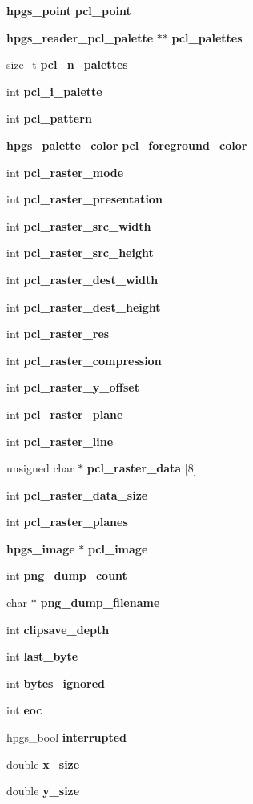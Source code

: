 \begin{DoxyCompactItemize}
{\bf hpgs\_\-point} {\bf pcl\_\-point}
\item 
{\bf hpgs\_\-reader\_\-pcl\_\-palette} $\ast$$\ast$ {\bf pcl\_\-palettes}
\item 
size\_\-t {\bf pcl\_\-n\_\-palettes}
\item 
int {\bf pcl\_\-i\_\-palette}
\item 
int {\bf pcl\_\-pattern}
\item 
{\bf hpgs\_\-palette\_\-color} {\bf pcl\_\-foreground\_\-color}
\item 
int {\bf pcl\_\-raster\_\-mode}
\item 
int {\bf pcl\_\-raster\_\-presentation}
\item 
int {\bf pcl\_\-raster\_\-src\_\-width}
\item 
int {\bf pcl\_\-raster\_\-src\_\-height}
\item 
int {\bf pcl\_\-raster\_\-dest\_\-width}
\item 
int {\bf pcl\_\-raster\_\-dest\_\-height}
\item 
int {\bf pcl\_\-raster\_\-res}
\item 
int {\bf pcl\_\-raster\_\-compression}
\item 
int {\bf pcl\_\-raster\_\-y\_\-offset}
\item 
int {\bf pcl\_\-raster\_\-plane}
\item 
int {\bf pcl\_\-raster\_\-line}
\item 
unsigned char $\ast$ {\bf pcl\_\-raster\_\-data} [8]
\item 
int {\bf pcl\_\-raster\_\-data\_\-size}
\item 
int {\bf pcl\_\-raster\_\-planes}
\item 
{\bf hpgs\_\-image} $\ast$ {\bf pcl\_\-image}
\item 
int {\bf png\_\-dump\_\-count}
\item 
char $\ast$ {\bf png\_\-dump\_\-filename}
\item 
int {\bf clipsave\_\-depth}
\item 
int {\bf last\_\-byte}
\item 
int {\bf bytes\_\-ignored}
\item 
int {\bf eoc}
\item 
hpgs\_\-bool {\bf interrupted}
\end{DoxyCompactItemize}
\begin{Indent}{\bf }\par
{\em \label{_amgrpd41d8cd98f00b204e9800998ecf8427e}
 }\begin{DoxyCompactItemize}
\item 
double {\bf x\_\-size}
\item 
double {\bfseries y\_\-size}\label{structhpgs__reader__st_a6596945c1dba7e48b3c9193a0e549c8f}

\end{DoxyCompactItemize}
\end{Indent}
